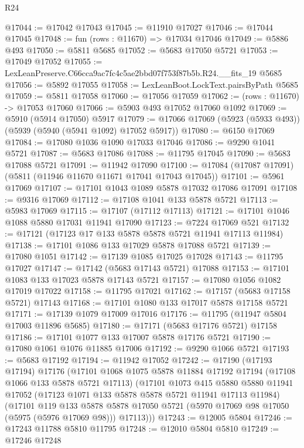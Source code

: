 \begin{lexlean}{R24}
\begin{coremodule}
@17044 := @17042 @17043
@17045 := @11910 @17027
@17046 := @17044 @17045
@17048 := fun (rows : @11670) => @17034 @17046
@17049 := @5886 @493
@17050 := @5811 @5685
@17052 := @5683 @17050 @5721
@17053 := @17049 @17052
@17055 := LexLeanPreserve.C66cca9ac7fc4c5ae2bbd07f753f87b5b.R24.__fits_19 @5685
@17056 := @5892 @17055
@17058 := LexLeanBoot.LockText.pairsByPath @5685
@17059 := @5811 @17058
@17060 := @17056 @17059
@17062 := (rows : @11670) -> @17053 @17060
@17066 := @5903 @493 @17052 @17060 @1092
@17069 := @5910 (@5914 @17050) @5917
@17079 := @17066 @17069 (@5923 (@5933 @493)) (@5939 (@5940 (@5941 @1092) @17052 @5917))
@17080 := @6150 @17069
@17084 := @17080 @1036 @1090 @17033 @17046
@17086 := @9290 @1041 @5721
@17087 := @5683 @17086
@17088 := @11795 @17045
@17090 := @5683 @17088 @5721
@17091 := @11942 @17090
@17100 := @17084 (@17087 @17091) (@5811 (@11946 @11670 @11671 @17041 @17043 @17045))
@17101 := @5961 @17069
@17107 := @17101 @1043 @1089 @5878 @17032 @17086 @17091
@17108 := @9316 @17069
@17112 := @17108 @1041 @133 @5878 @5721
@17113 := @5983 @17069
@17115 := @17107 (@17112 @17113)
@17121 := @17101 @1046 @1088 @5880 @17031 @11941 @17090
@17123 := @7224 @17069 @521
@17132 := @17121 (@17123 @17 @133 @5878 @5878 @5721 @11941 @17113 @11984)
@17138 := @17101 @1086 @133 @17029 @5878 @17088 @5721
@17139 := @17080 @1051
@17142 := @17139 @1085 @17025 @17028
@17143 := @11795 @17027
@17147 := @17142 (@5683 @17143 @5721) @17088
@17153 := @17101 @1083 @133 @17023 @5878 @17143 @5721
@17157 := @17080 @1056 @1082 @17019 @17022
@17158 := @11795 @17021
@17162 := @17157 (@5683 @17158 @5721) @17143
@17168 := @17101 @1080 @133 @17017 @5878 @17158 @5721
@17171 := @17139 @1079 @17009 @17016
@17176 := @11795 (@11947 @5804 @17003 @11896 @5685)
@17180 := @17171 (@5683 @17176 @5721) @17158
@17186 := @17101 @1077 @133 @17007 @5878 @17176 @5721
@17190 := @17080 @1061 @1076 @11885 @17006
@17192 := @9290 @1066 @5721
@17193 := @5683 @17192
@17194 := @11942 @17052
@17242 := @17190
    (@17193 @17194)
    @17176
    (@17101
      @1068
      @1075
      @5878
      @11884
      @17192
      @17194
      (@17108 @1066 @133 @5878 @5721 @17113)
      (@17101
        @1073
        @415
        @5880
        @5880
        @11941
        @17052
        (@17123 @1071 @133 @5878 @5878 @5721 @11941 @17113 @11984)
        (@17101
          @119
          @133
          @5878
          @5878
          @17050
          @5721
          (@5970 @17069 @98 @17050 (@5975 (@5976 @17069 @98)))
          @17113)))
@17243 := @12005 @5804
@17246 := @17243 @11788 @5810 @11795
@17248 := @12010 @5804 @5810
@17249 := @17246 @17248

\end{coremodule}
\end{lexlean}
